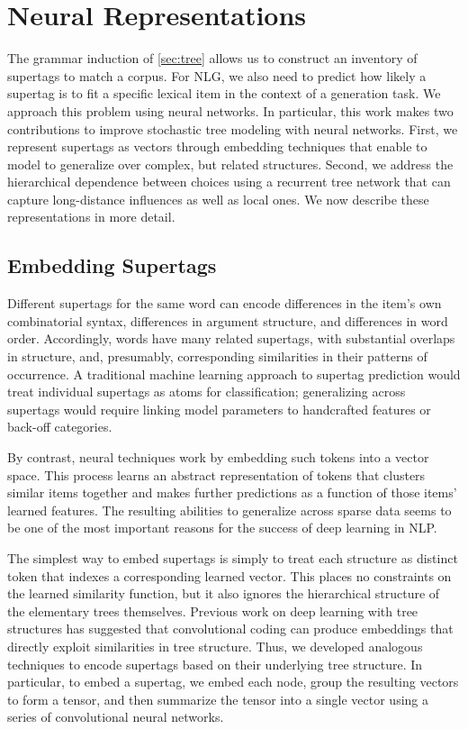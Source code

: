 \documentclass[11pt]{article}
\begin{document}
\section{Neural Representations}
\label{sec:neural}

The grammar induction of \ref{sec:tree} allows us to construct an
inventory of supertags to match a corpus.  For NLG, we also need to
predict how likely a supertag is to fit a specific lexical item in the
context of a generation task.  We approach this problem using neural
networks. 
%
In particular, this work makes two contributions to improve stochastic
tree modeling with neural networks.
%
First, we represent supertags as vectors through embedding techniques
that enable to model to generalize over complex, but related
structures.
%
Second, we address the hierarchical dependence between choices using a
recurrent tree network that can capture long-distance influences as
well as local ones.
%
We now describe these representations in more detail.

\subsection{Embedding Supertags}

Different supertags for the same word can encode differences in the
item's own combinatorial syntax, differences in argument structure, and
differences in word order.  Accordingly, words have many related
supertags, with substantial overlaps in structure, and, presumably,
corresponding similarities in their patterns of occurrence.  A
traditional machine learning approach to supertag prediction would
treat individual supertags as atoms for classification; generalizing
across supertags would require linking model parameters to handcrafted
features or back-off categories.

By contrast, neural techniques work by embedding such tokens into a
vector space. This process learns an abstract representation of tokens
that clusters similar items together and makes further predictions
as a function of those items' learned features.  The resulting
abilities to generalize across sparse data seems to be one of the most
important reasons for the success of deep learning in NLP.

The simplest way to embed supertags is simply to treat each structure
as distinct token that indexes a corresponding learned vector.  This
places no constraints on the learned similarity function, but it also
ignores the hierarchical structure of the elementary trees
themselves.  Previous work on deep learning with tree structures has
suggested that convolutional coding can produce embeddings that
directly exploit similarities in tree structure.  Thus, we developed
analogous techniques to encode supertags based on their underlying
tree structure.  In particular, to embed a supertag, we embed each
node, group the resulting vectors to form a tensor, and then summarize
the tensor into a single vector using a series of convolutional neural
networks.
\end{document}
